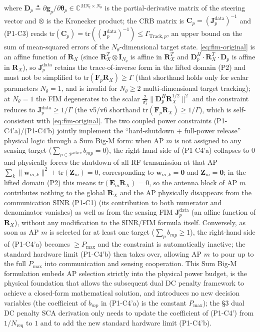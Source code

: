 \documentclass[12pt,a4paper]{article}
\newcommand{\vect}[1]{\mathbf{#1}}
\newcommand{\mat}[1]{\mathbf{#1}}
\newcommand{\tr}{\text{tr}}
\begin{document}
where $\mat{D}_p \triangleq \partial \vect{g}_p / \partial \boldsymbol{\theta}_p \in \mathbb{C}^{MN_t \times N_\theta}$ is the partial-derivative matrix of the steering vector and $\otimes$ is the Kronecker product; the CRB matrix is $\mat{C}_p = (\mat{J}_p^{\text{data}})^{-1}$ and (P1-C3) reads $\tr(\mat{C}_p) = \tr((\mat{J}_p^{\text{data}})^{-1}) \leq \Gamma_{\text{Track},p}$, an upper bound on the sum of mean-squared errors of the $N_\theta$-dimensional target state. \eqref{eq:fim-original} is an affine function of $\mat{R}_X$ (since $\mat{R}_X^T \otimes \mat{I}_{N_\theta}$ is affine in $\mat{R}_X^T$ and $\mat{D}_p^H \cdot \mat{R}_X^T \cdot \mat{D}_p$ is affine in $\mat{R}_X$), so $\mat{J}_p^{\text{data}}$ retains the trace-of-inverse form in the lifted domain (P2) and must not be simplified to $\tr(\mat{F}_p \mat{R}_X) \geq \Gamma$ (that shorthand holds only for scalar parameters $N_\theta = 1$, and is invalid for $N_\theta \geq 2$ multi-dimensional target tracking); at $N_\theta = 1$ the FIM degenerates to the scalar $\frac{2}{\sigma_s^2} \|\mat{D}_p^H \mat{R}_X^{1/2}\|^2$ and the constraint reduces to $\mat{J}_p^{\text{data}} \geq 1/\Gamma$ (the v5/v6 shorthand $\tr(\mat{F}_p \mat{R}_X) \geq 1/\Gamma$), which is self-consistent with \eqref{eq:fim-original}. The two coupled power constraints (P1-C4'a)/(P1-C4'b) jointly implement the ``hard-shutdown + full-power release'' physical logic through a Sum Big-M form: when AP $m$ is not assigned to any sensing target ($\sum_{p \in \mathcal{P}^{\text{active}}} b_{mp} = 0$), the right-hand side of (P1-C4'a) collapses to $0$ and physically forces the shutdown of all RF transmission at that AP---$\sum_k \|\vect{w}_{m,k}\|^2 + \tr(\mat{Z}_m) = 0$, corresponding to $\vect{w}_{m,k} = \mat{0}$ and $\mat{Z}_m = \mat{0}$; in the lifted domain (P2) this means $\tr(\mat{E}_m \mat{R}_X) = 0$, so the antenna block of AP $m$ contributes nothing to the global $\mat{R}_X$ and the AP physically disappears from the communication SINR (P1-C1) (its contribution to both numerator and denominator vanishes) as well as from the sensing FIM $\mat{J}_p^{\text{data}}$ (an affine function of $\mat{R}_X$), without any modification to the SINR/FIM formula itself. Conversely, as soon as AP $m$ is selected for at least one target ($\sum_p b_{mp} \geq 1$), the right-hand side of (P1-C4'a) becomes $\geq P_{\max}$ and the constraint is automatically inactive; the standard hardware limit (P1-C4'b) then takes over, allowing AP $m$ to pour up to the full $P_{\max}$ into communication and sensing cooperation. This Sum Big-M formulation embeds AP selection strictly into the physical power budget, is the physical foundation that allows the subsequent dual DC penalty framework to achieve a closed-form mathematical solution, and introduces no new decision variables (the coefficient of $b_{mp}$ in (P1-C4'a) is the constant $P_{\max}$); the \S3 dual DC penalty SCA derivation only needs to update the coefficient of (P1-C4') from $1/N_{\text{req}}$ to $1$ and to add the new standard hardware limit (P1-C4'b).
\end{document}
